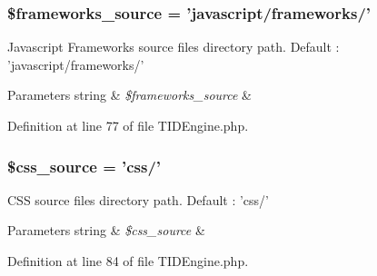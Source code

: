 \hypertarget{group__paths__settings_ga35ab8cb7ae69ec347b63dda82a173005}{
\subsubsection[{\$frameworks\_\-source}]{\setlength{\rightskip}{0pt plus 5cm}\$frameworks\_\-source = 'javascript/frameworks/'}}
\label{group__paths__settings_ga35ab8cb7ae69ec347b63dda82a173005}
Javascript Frameworks source files directory path. Default : 'javascript/frameworks/' 
\begin{DoxyParams}[1]{Parameters}
string & {\em \$frameworks\_\-source} & \\
\hline
\end{DoxyParams}


Definition at line 77 of file TIDEngine.php.

\hypertarget{group__paths__settings_ga117298df65ff2026617e125d21463b93}{
\subsubsection[{\$css\_\-source}]{\setlength{\rightskip}{0pt plus 5cm}\$css\_\-source = 'css/'}}
\label{group__paths__settings_ga117298df65ff2026617e125d21463b93}
CSS source files directory path. Default : 'css/' 
\begin{DoxyParams}[1]{Parameters}
string & {\em \$css\_\-source} & \\
\hline
\end{DoxyParams}


Definition at line 84 of file TIDEngine.php.

